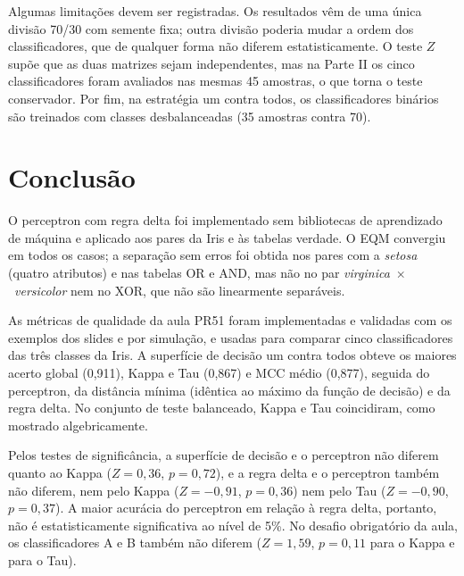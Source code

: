 \documentclass[12pt,a4paper]{article}
\newcommand{\setosa}{\emph{setosa}}
\newcommand{\versicolor}{\emph{versicolor}}
\newcommand{\virginica}{\emph{virginica}}
\begin{document}
Algumas limitações devem ser registradas. Os resultados vêm de uma única divisão 70/30 com semente fixa; outra divisão poderia mudar a ordem dos classificadores, que de qualquer forma não diferem estatisticamente. O teste $Z$ supõe que as duas matrizes sejam independentes, mas na Parte II os cinco classificadores foram avaliados nas mesmas 45 amostras, o que torna o teste conservador. Por fim, na estratégia um contra todos, os classificadores binários são treinados com classes desbalanceadas (35 amostras contra 70).

\section{Conclusão}

O perceptron com regra delta foi implementado sem bibliotecas de aprendizado de máquina e aplicado aos pares da Iris e às tabelas verdade. O EQM convergiu em todos os casos; a separação sem erros foi obtida nos pares com a \setosa{} (quatro atributos) e nas tabelas OR e AND, mas não no par \virginica{}~$\times$~\versicolor{} nem no XOR, que não são linearmente separáveis.

As métricas de qualidade da aula PR51 foram implementadas e validadas com os exemplos dos slides e por simulação, e usadas para comparar cinco classificadores das três classes da Iris. A superfície de decisão um contra todos obteve os maiores acerto global (0,911), Kappa e Tau (0,867) e MCC médio (0,877), seguida do perceptron, da distância mínima (idêntica ao máximo da função de decisão) e da regra delta. No conjunto de teste balanceado, Kappa e Tau coincidiram, como mostrado algebricamente.

Pelos testes de significância, a superfície de decisão e o perceptron não diferem quanto ao Kappa ($Z = 0{,}36$, $p = 0{,}72$), e a regra delta e o perceptron também não diferem, nem pelo Kappa ($Z = -0{,}91$, $p = 0{,}36$) nem pelo Tau ($Z = -0{,}90$, $p = 0{,}37$). A maior acurácia do perceptron em relação à regra delta, portanto, não é estatisticamente significativa ao nível de 5\%. No desafio obrigatório da aula, os classificadores A e B também não diferem ($Z = 1{,}59$, $p = 0{,}11$ para o Kappa e para o Tau).
\end{document}
